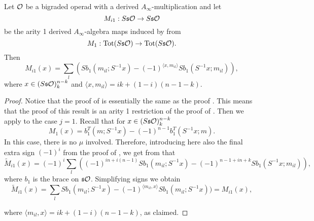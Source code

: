 \documentclass[join.tex]{subfiles}
\begin{document}
\begin{corollary}\label{mi1}
Let ${\mathcal O}$ be a bigraded operad with a derived $A_\infty$-multiplication and let \[M_{i1}:S\mathfrak{s}{\mathcal O}\to S\mathfrak{s}{\mathcal O}\] be the arity 1 derived $A_\infty$-algebra maps induced by  from \[M_1:\mathrm{Tot}(S\mathfrak{s}{\mathcal O})\to \mathrm{Tot}(S\mathfrak{s}{\mathcal O}).\]
Then \[M_{i1}(x)= \sum_l (Sb_1(m_{il};S^{-1}x)-(-1)^{\langle x,m_{il}\rangle}Sb_1(S^{-1}x;m_{il})),\]
where $x\in (S\mathfrak{s}{\mathcal O})^{n-k}_k$ and $\langle x,m_{il}\rangle=ik+(1-i)(n-1-k)$.
\end{corollary}
\begin{proof}
Notice that the proof of  is essentially the same as the proof . This means that the proof of this result is an arity 1 restriction of the proof of . Then we apply  to the case $j=1$. Recall that for $x\in (S\mathfrak{s}{\mathcal O})^{n-k}_{k}$
\[M_1(x)=b_1^T(m;S^{-1}x)-(-1)^{n-1}b_1^T(S^{-1}x;m).\]
 In this case, there is no $\mu$ involved. Therefore, introducing here also the final extra sign $(-1)^i$ from the proof of , we get from  that
\[\widetilde{M}_{i1}(x)=(-1)^i\sum_l((-1)^{in+i(n-1)} Sb_1(m_{il};S^{-1}x)-(-1)^{n-1+in+k}Sb_1(S^{-1}x;m_{il})),\] where $b_1$ is the brace on $\mathfrak{s}{\mathcal O}$. Simplifying signs we obtain
\[\widetilde{M}_{i1}(x)=\sum_l Sb_1(m_{il};S^{-1}x)-(-1)^{\langle  m_{il},x\rangle}Sb_1(m_{il};S^{-1}x))=M_{i1}(x),\]

where $\langle  m_{il},x\rangle=ik+(1-i)(n-1-k)$, as claimed.
\end{proof}


\end{document}
